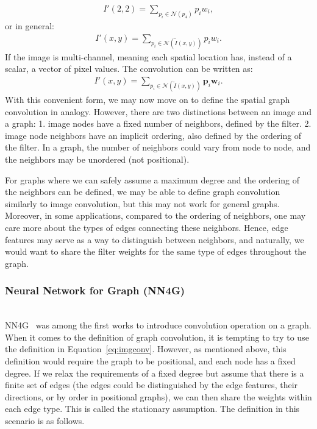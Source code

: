 \begin{gather}
I'(2, 2) = \sum_{p_i \in \mathcal {N}(p_4)} p_i w_i,
\end{gather}
or in general:
\begin{gather}
I'(x, y) = \sum_{p_i \in \mathcal {N}(\tilde I(x, y))} p_i w_i.
\end{gather}
If the image is multi-channel, meaning each spatial location has, instead of a scalar, a vector of pixel values. The convolution can be written as:
\begin{gather}
\label{eq:imgconv}
I'(x, y) = \sum_{p_i \in \mathcal {N}(\tilde I(x, y))} \mathbf{p}_i \mathbf{w}_i.
\end{gather}
With this convenient form, we may now move on to define the spatial graph convolution in analogy. However, there are two distinctions between an image and a graph: 1. image nodes have a fixed number of neighbors, defined by the filter. 2. image node neighbors have an implicit ordering, also defined by the ordering of the filter. In a graph, the number of neighbors could vary from node to node, and the neighbors may be unordered (not positional). 

For graphs where we can safely assume a maximum degree and the ordering of the neighbors can be defined, we may be able to define graph convolution similarly to image convolution, but this may not work for general graphs. Moreover, in some applications, compared to the ordering of neighbors, one may care more about the types of edges connecting these neighbors. Hence, edge features may serve as a way to distinguish between neighbors, and naturally, we would want to share the filter weights for the same type of edges throughout the graph. 





\subsubsection{Neural Network for Graph (NN4G)} \hfill \\
NN4G~\cite{nn4g} was among the first works to introduce convolution operation on a graph. When it comes to the definition of graph convolution, it is tempting to try to use the definition in Equation~\ref{eq:imgconv}. However, as mentioned above, this definition would require the graph to be positional, and each node has a fixed degree. If we relax the requirements of a fixed degree but assume that there is a finite set of edges (the edges could be distinguished by the edge features, their directions, or by order in positional graphs), we can then share the weights within each edge type. This is called the stationary assumption. The definition in this scenario is as follows.

